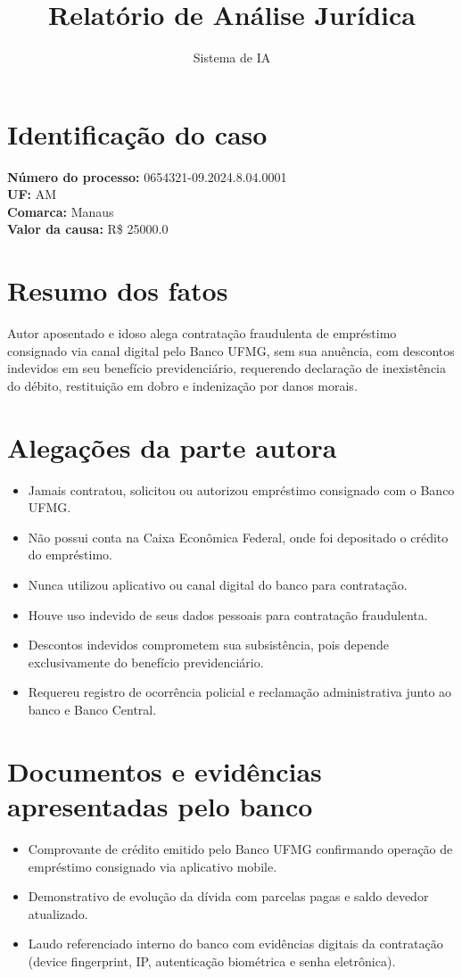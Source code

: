 \documentclass[12pt]{article}
\title{Relatório de Análise Jurídica}
\author{Sistema de IA}
\date{}
\begin{document}
\maketitle

\section*{Identificação do caso}

\textbf{Número do processo:} 0654321-09.2024.8.04.0001 \\
\textbf{UF:} AM \\
\textbf{Comarca:} Manaus \\
\textbf{Valor da causa:} R\$ 25000.0

\section*{Resumo dos fatos}
Autor aposentado e idoso alega contratação fraudulenta de empréstimo consignado via canal digital pelo Banco UFMG, sem sua anuência, com descontos indevidos em seu benefício previdenciário, requerendo declaração de inexistência do débito, restituição em dobro e indenização por danos morais.

\section*{Alegações da parte autora}
\begin{itemize}
\item Jamais contratou, solicitou ou autorizou empréstimo consignado com o Banco UFMG.
\item Não possui conta na Caixa Econômica Federal, onde foi depositado o crédito do empréstimo.
\item Nunca utilizou aplicativo ou canal digital do banco para contratação.
\item Houve uso indevido de seus dados pessoais para contratação fraudulenta.
\item Descontos indevidos comprometem sua subsistência, pois depende exclusivamente do benefício previdenciário.
\item Requereu registro de ocorrência policial e reclamação administrativa junto ao banco e Banco Central.
\end{itemize}

\section*{Documentos e evidências apresentadas pelo banco}
\begin{itemize}
\item Comprovante de crédito emitido pelo Banco UFMG confirmando operação de empréstimo consignado via aplicativo mobile.
\item Demonstrativo de evolução da dívida com parcelas pagas e saldo devedor atualizado.
\item Laudo referenciado interno do banco com evidências digitais da contratação (device fingerprint, IP, autenticação biométrica e senha eletrônica).
\end{itemize}
\end{document}
